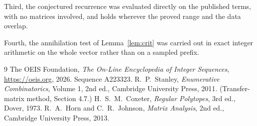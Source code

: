 \documentclass[11pt,a4paper]{article}
\theoremstyle{plain}
\theoremstyle{definition}
\begin{document}
Third, the conjectured recurrence was evaluated directly on the published terms, with no
matrices involved, and holds wherever the proved range and the data overlap.

Fourth, the annihilation test of Lemma~\ref{lem:crit} was carried out in exact integer
arithmetic on the whole vector rather than on a sampled prefix.

\begin{thebibliography}{9}
 The OEIS Foundation, \emph{The On-Line Encyclopedia of Integer
Sequences}, \url{https://oeis.org}, 2026. Sequence A223323.
 R.~P.~Stanley, \emph{Enumerative Combinatorics}, Volume 1, 2nd ed.,
Cambridge University Press, 2011. (Transfer-matrix method, Section 4.7.)
 H.~S.~M.~Coxeter, \emph{Regular Polytopes}, 3rd ed., Dover, 1973.
 R.~A.~Horn and C.~R.~Johnson, \emph{Matrix Analysis}, 2nd ed., Cambridge
University Press, 2013.
\end{thebibliography}
\end{document}
